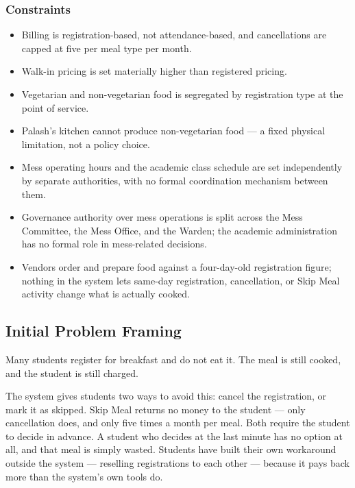 \documentclass[11pt]{article}
\begin{document}
\subsubsection*{Constraints}
\begin{itemize}
    \item Billing is registration-based, not attendance-based, and cancellations are
        capped at five per meal type per month.
    \item Walk-in pricing is set materially higher than registered pricing.
    \item Vegetarian and non-vegetarian food is segregated by registration type at
        the point of service.
    \item Palash's kitchen cannot produce non-vegetarian food --- a fixed physical
        limitation, not a policy choice.
    \item Mess operating hours and the academic class schedule are set independently
        by separate authorities, with no formal coordination mechanism between them.
    \item Governance authority over mess operations is split across the Mess
        Committee, the Mess Office, and the Warden; the academic administration has
        no formal role in mess-related decisions.
    \item Vendors order and prepare food against a four-day-old registration figure;
        nothing in the system lets same-day registration, cancellation, or Skip Meal
        activity change what is actually cooked.
\end{itemize}

\subsection{Initial Problem Framing}

Many students register for breakfast and do not eat it. The meal is still cooked, and
the student is still charged.

The system gives students two ways to avoid this: cancel the registration, or mark it
as skipped. Skip Meal returns no money to the student --- only cancellation does, and
only five times a month per meal. Both require the student to decide in advance. A
student who decides at the last minute has no option at all, and that meal is simply
wasted. Students have built their own workaround outside the system --- reselling
registrations to each other --- because it pays back more than the system's own tools
do.
\end{document}
